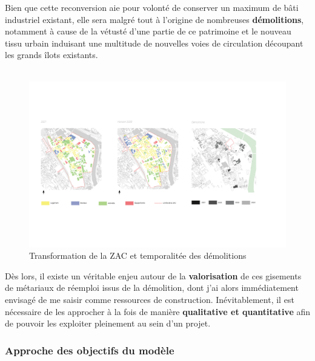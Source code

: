 \documentclass[
  11pt,
  french,
]{article}
\begin{document}
\hfill\break
\hfill\break
Bien que cette reconversion aie pour volonté de conserver un maximum de
bâti industriel existant, elle sera malgré tout à l'origine de
nombreuses \textbf{démolitions}, notamment à cause de la vétusté d'une
partie de ce patrimoine et le nouveau tissu urbain induisant une
multitude de nouvelles voies de circulation découpant les grands îlots
existants.\\
~\\

\begin{tcolorbox}
\begin{figure}

{\centering \includegraphics[width=0.9\linewidth]{__imgs/zac_schema} 

}

\caption[Transformation de la ZAC et temporalitée des démolitions  -  Réalisation personnelle]{Transformation de la ZAC et temporalitée des démolitions}\label{fig:zac_schema}
\end{figure}
\end{tcolorbox}

\hfill\break
\hfill\break
Dès lors, il existe un véritable enjeu autour de la
\textbf{valorisation} de ces gisements de métariaux de réemploi issus de
la démolition, dont j'ai alors immédiatement envisagé de me saisir comme
ressources de construction. Inévitablement, il est nécessaire de les
approcher à la fois de manière \textbf{qualitative et quantitative} afin
de pouvoir les exploiter pleinement au sein d'un projet.

\hypertarget{approche-des-objectifs-du-moduxe8le}{%
\subsubsection{Approche des objectifs du
modèle}\label{approche-des-objectifs-du-moduxe8le}}
\end{document}
